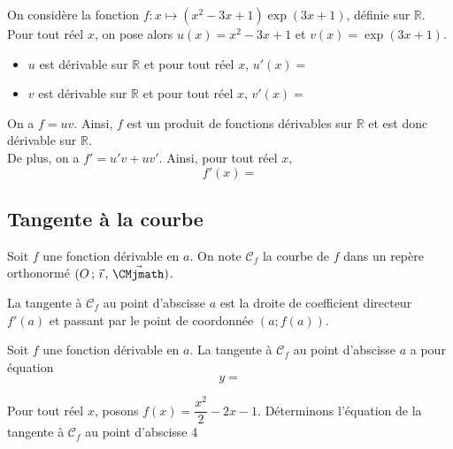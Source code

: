 \documentclass[11pt,fleqn, openany]{book} %
\begin{document}
\begin{example}On considère la fonction $f:x\mapsto (x^2-3x+1)\exp(3x+1)$, définie sur $\mathbb{R}$. \\ Pour tout réel $x$, on pose alors $u(x)=x^2-3x+1$ et $v(x)=\exp(3x+1)$. 

\begin{itemize}
\item $u$ est dérivable sur $\mathbb{R}$ et pour tout réel $x$, $u'(x)=$
\item $v$ est dérivable sur $\mathbb{R}$ et pour tout réel $x$, $v'(x)=$
\end{itemize}

On a $f=uv$. Ainsi, $f$ est un produit de fonctions dérivables sur $\mathbb{R}$ et est donc dérivable sur $\mathbb{R}$. \\ De plus, on a $f'=u'v+uv'$. Ainsi, pour tout réel $x$, 
\[ f'(x)=\]
\vspace{-0.5cm}\end{example}

\subsection{Tangente à la courbe}

\begin{definition} Soit $f$ une fonction dérivable en $a$. On note $\mathcal{C}_f$ la courbe de $f$ dans un repère orthonormé $\Oij$. 

La tangente à $\mathcal{C}_f$ au point d'abscisse $a$ est la droite de coefficient directeur $f'(a)$ et passant par le point de coordonnée $(a;f(a))$.\end{definition} 

\begin{proposition}Soit $f$ une fonction dérivable en $a$. La tangente à $\mathcal{C}_f$ au point d'abscisse $a$ a pour équation 
\[ y =\]\end{proposition}

\begin{example}Pour tout réel $x$, posons $f(x)=\dfrac{x^2}{2}-2x-1$. Déterminons l'équation de la tangente à $\mathcal{C}_f$ au point d'abscisse 4 

\begin{flushright}
\end{flushright}
\vspace{-1cm}
 \end{example}
\end{document}
